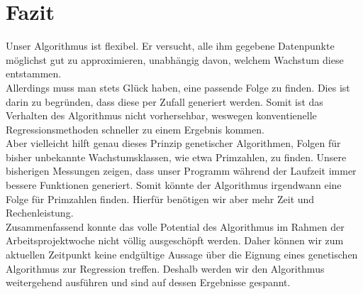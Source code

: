 \documentclass[a4paper,12pt]{article}
\begin{document}
\section{Fazit}
Unser Algorithmus ist flexibel. Er versucht, alle ihm gegebene Datenpunkte möglichst gut zu approximieren, unabhängig davon, welchem Wachstum diese entstammen.\\
\noindent Allerdings muss man stets Glück haben, eine passende Folge zu finden. Dies ist darin zu begründen, dass diese per Zufall generiert werden. Somit ist das Verhalten des Algorithmus nicht vorhersehbar, weswegen konventienelle Regressionsmethoden schneller zu einem Ergebnis kommen.\\
\noindent Aber vielleicht hilft genau dieses Prinzip genetischer Algorithmen, Folgen für bisher unbekannte Wachstumsklassen, wie etwa Primzahlen, zu finden. Unsere bisherigen Messungen zeigen, dass unser Programm während der Laufzeit immer bessere Funktionen generiert. Somit könnte der Algorithmus irgendwann eine Folge für Primzahlen finden. Hierfür benötigen wir aber mehr Zeit und Rechenleistung.\\
\noindent Zusammenfassend konnte das volle Potential des Algorithmus im Rahmen der Arbeitsprojektwoche nicht völlig ausgeschöpft werden. Daher können wir zum aktuellen Zeitpunkt keine endgültige Aussage über die Eignung eines genetischen Algorithmus zur Regression treffen. Deshalb werden wir den Algorithmus weitergehend ausführen und sind auf dessen Ergebnisse gespannt.
\newpage
\end{document}
